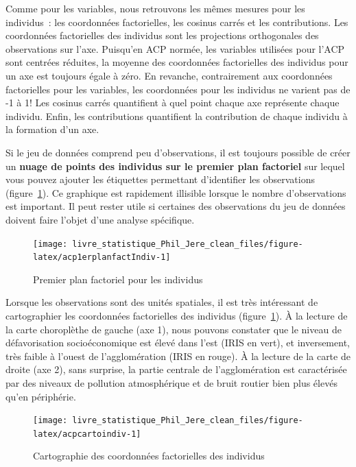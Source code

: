 \documentclass[
  11pt,
  french,
]{book}
\begin{document}
Comme pour les variables, nous retrouvons les mêmes mesures pour les individus~: les coordonnées factorielles, les cosinus carrés et les contributions. Les coordonnées factorielles des individus sont les projections orthogonales des observations sur l'axe. Puisqu'en ACP normée, les variables utilisées pour l'ACP sont centrées réduites, la moyenne des coordonnées factorielles des individus pour un axe est toujours égale à zéro. En revanche, contrairement aux coordonnées factorielles pour les variables, les coordonnées pour les individus ne varient pas de -1 à 1! Les cosinus carrés quantifient à quel point chaque axe représente chaque individu. Enfin, les contributions quantifient la contribution de chaque individu à la formation d'un axe.

Si le jeu de données comprend peu d'observations, il est toujours possible de créer un \textbf{nuage de points des individus sur le premier plan factoriel} sur lequel vous pouvez ajouter les étiquettes permettant d'identifier les observations (figure~\ref{fig:acp1erplanfactIndiv}). Ce graphique est rapidement illisible lorsque le nombre d'observations est important. Il peut rester utile si certaines des observations du jeu de données doivent faire l'objet d'une analyse spécifique.

\begin{figure}

{\centering \texttt{[image: livre\_statistique\_Phil\_Jere\_clean\_files/figure-latex/acp1erplanfactIndiv-1]} 

}

\caption{Premier plan factoriel pour les individus}\label{fig:acp1erplanfactIndiv}
\end{figure}

Lorsque les observations sont des unités spatiales, il est très intéressant de cartographier les coordonnées factorielles des individus (figure~\ref{fig:acp1erplanfactIndiv}). À la lecture de la carte choroplèthe de gauche (axe 1), nous pouvons constater que le niveau de défavorisation socioéconomique est élevé dans l'est (IRIS en vert), et inversement, très faible à l'ouest de l'agglomération (IRIS en rouge). À la lecture de la carte de droite (axe 2), sans surprise, la partie centrale de l'agglomération est caractérisée par des niveaux de pollution atmosphérique et de bruit routier bien plus élevés qu'en périphérie.

\begin{figure}

{\centering \texttt{[image: livre\_statistique\_Phil\_Jere\_clean\_files/figure-latex/acpcartoindiv-1]} 

}

\caption{Cartographie des coordonnées factorielles des individus}\label{fig:acpcartoindiv}
\end{figure}
\end{document}
